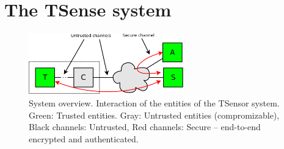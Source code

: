 \section{The TSense system}
\label{sec:tsense-system-overview}

\begin{figure}
\begin{center}
\includegraphics[width=0.6\textwidth]{../figures/sys-overview.png} 
\end{center}
\caption{System overview. Interaction of the entities of the TSensor system. Green: Trusted entities. Gray: Untrusted entities (compromizable), Black channels: Untrusted, Red channels: Secure -- end-to-end encrypted and authenticated.}
\label{fig:sys-overview}
\end{figure}

